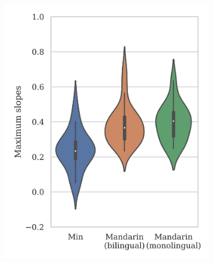 \begin{figure}[hbt!]
\centering
\begin{subfigure}[b]{.45\textwidth}
\centering
\includegraphics[width=\textwidth]{figures/E3/Result_21.png}
\end{subfigure}
\hfill
\begin{subfigure}[b]{.45\textwidth}
\centering

\end{subfigure}
\end{figure}

